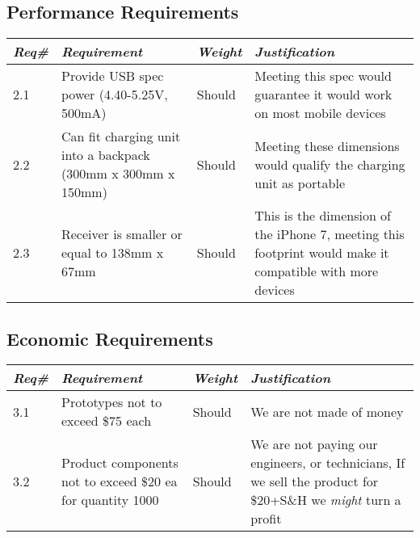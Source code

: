     \subsection{Performance Requirements}
        \begin{centering}
        \begin{tabular}{|l|m{7cm}|l|m{7cm}|} \hline
        \textit{\textbf{Req\#}}	& \textit{\textbf{Requirement}} &\textit{\textbf{Weight}}&\textit{\textbf{Justification}} \\ \hline
        2.1	& Provide USB spec power (4.40-5.25V, 500mA)	& Should & Meeting this spec would guarantee it would work on most mobile devices \\ \hline
        2.2	& Can fit charging unit into a backpack (300mm x 300mm x 150mm)	& Should & Meeting these dimensions would qualify the charging unit as portable \\ \hline
        2.3	& Receiver is smaller or equal to 138mm x 67mm	& Should & This is the dimension of the iPhone 7, meeting this footprint would make it compatible with more devices \\ \hline
        \end{tabular}
        \end{centering}
    
    \subsection{Economic Requirements}
        \begin{centering}
        \begin{tabular}{|l|m{7cm}|l|m{7cm}|} \hline
        \textit{\textbf{Req\#}}	& \textit{\textbf{Requirement}} &\textit{\textbf{Weight}}&\textit{\textbf{Justification}} \\ \hline
        3.1 & Prototypes not to exceed \$75 each & Should & We are not made of money  \\ \hline
        3.2 & Product components not to exceed \$20 ea for quantity 1000 & Should & We are not paying our engineers, or technicians, If we sell the product for \$20+S\&H we \textit{might} turn a profit \\ \hline
        \end{tabular}
        \end{centering}    

